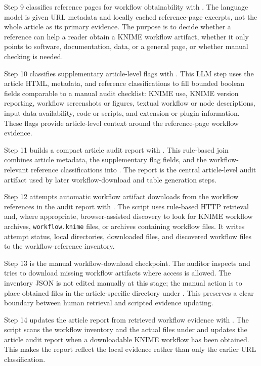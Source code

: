 \documentclass[runningheads]{llncs}
\begin{document}
Step 9 classifies reference pages for workflow obtainability with
. The language model is
given URL metadata and locally cached reference-page excerpts, not the whole
article as its primary evidence. The purpose is to decide whether a reference
can help a reader obtain a KNIME workflow artifact, whether it only points to
software, documentation, data, or a general page, or whether manual checking is
needed.

Step 10 classifies supplementary article-level flags with
. This LLM step
uses the article HTML, metadata, and reference classifications to fill bounded
boolean fields comparable to a manual audit checklist: KNIME use, KNIME version
reporting, workflow screenshots or figures, textual workflow or node
descriptions, input-data availability, code or scripts, and extension or
plugin information. These flags provide article-level context around the
reference-page workflow evidence.

Step 11 builds a compact article audit report with
. This rule-based join combines
article metadata, the supplementary flag fields, and the workflow-relevant
reference classifications into
. The report is the
central article-level audit artifact used by later workflow-download and table
generation steps.

Step 12 attempts automatic workflow artifact downloads from the workflow
references in the audit report with
. The script uses rule-based
HTTP retrieval and, where appropriate, browser-assisted discovery to look for
KNIME workflow archives, \texttt{workflow.knime} files, or archives containing
workflow files. It writes attempt status, local directories, downloaded files,
and discovered workflow files to the workflow-reference inventory.

Step 13 is the manual workflow-download checkpoint. The auditor inspects
 and
tries to download missing workflow artifacts where access is allowed. The
inventory JSON is not edited manually at this stage; the manual action is to
place obtained files in the article-specific directory under
. This preserves a clear boundary between human
retrieval and scripted evidence updating.

Step 14 updates the article report from retrieved workflow evidence with
. The script scans
the workflow inventory and the actual files under 
and updates the article audit report when a downloadable KNIME workflow has
been obtained. This makes the report reflect the local evidence rather than
only the earlier URL classification.
\end{document}
